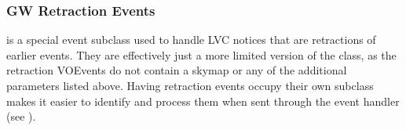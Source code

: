 \begin{colsection}
\subsubsection{GW Retraction Events}

 is a special event subclass used to handle LVC notices that are retractions of earlier events. They are effectively just a more limited version of the  class, as the retraction VOEvents do not contain a skymap or any of the additional parameters listed above. Having retraction events occupy their own subclass makes it easier to identify and process them when sent through the event handler (see ).

\newpage

\end{colsection}


